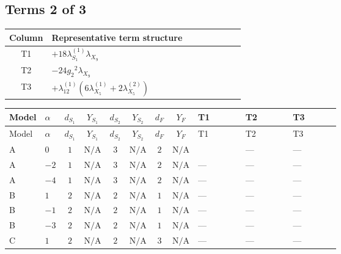 \documentclass[8pt]{article}
\begin{document}
\begin{landscape}
\subsection*{Terms 2 of 3}
\begin{center}
\begin{tabular}{@{}c >{\raggedright\arraybackslash}p{0.82\linewidth}@{}}
\toprule
Column & Representative term structure \\
\midrule
T1 & \(\displaystyle +18 {\lambda_{S_1}^{(1)}} {\lambda_{X_{9}}}\) \\
\midrule
T2 & \(\displaystyle -24 {g_2}^2 {\lambda_{X_{9}}}\) \\
\midrule
T3 & \(\displaystyle +{\lambda_{12}^{(1)}} (6 {\lambda_{X_{5}}^{(1)}}+2 {\lambda_{X_{5}}^{(2)}})\) \\
\midrule
\bottomrule
\end{tabular}
\end{center}
\smallskip
\tiny
\begin{longtable}{@{}llcccccc >{\raggedright\arraybackslash}p{0.21\linewidth} >{\raggedright\arraybackslash}p{0.21\linewidth} >{\raggedright\arraybackslash}p{0.21\linewidth}@{}}
\toprule
Model & $\alpha$ & $d_{S_1}$ & $Y_{S_1}$ & $d_{S_2}$ & $Y_{S_2}$ & $d_F$ & $Y_F$ & T1 & T2 & T3 \\
\midrule
\endfirsthead
\toprule
Model & $\alpha$ & $d_{S_1}$ & $Y_{S_1}$ & $d_{S_2}$ & $Y_{S_2}$ & $d_F$ & $Y_F$ & T1 & T2 & T3 \\
\midrule
\endhead
A & $0$ & $1$ & $\text{N/A}$ & $3$ & $\text{N/A}$ & $2$ & $\text{N/A}$ & \scriptsize\adjustbox{max width=\linewidth}{$\begin{gathered} +18 {\lambda_{S_1}^{(1)}} {\lambda_{X_{9}}}\end{gathered}$} & --- & --- \\
\midrule
A & $-2$ & $1$ & $\text{N/A}$ & $3$ & $\text{N/A}$ & $2$ & $\text{N/A}$ & --- & --- & --- \\
\midrule
A & $-4$ & $1$ & $\text{N/A}$ & $3$ & $\text{N/A}$ & $2$ & $\text{N/A}$ & --- & --- & --- \\
\midrule
B & $1$ & $2$ & $\text{N/A}$ & $2$ & $\text{N/A}$ & $1$ & $\text{N/A}$ & --- & --- & --- \\
\midrule
B & $-1$ & $2$ & $\text{N/A}$ & $2$ & $\text{N/A}$ & $1$ & $\text{N/A}$ & --- & --- & --- \\
\midrule
B & $-3$ & $2$ & $\text{N/A}$ & $2$ & $\text{N/A}$ & $1$ & $\text{N/A}$ & --- & --- & --- \\
\midrule
C & $1$ & $2$ & $\text{N/A}$ & $2$ & $\text{N/A}$ & $3$ & $\text{N/A}$ & --- & --- & --- \\

\end{longtable}
\end{landscape}
\end{document}
